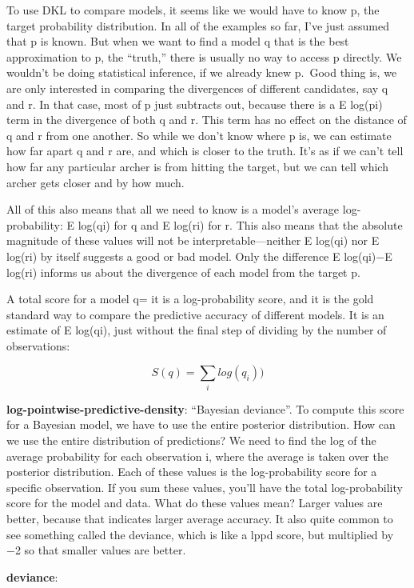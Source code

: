 \documentclass[
]{article}
\begin{document}
To use DKL to compare models, it seems like we would have to know p, the
target probability distribution. In all of the examples so far, I've
just assumed that p is known. But when we want to find a model q that is
the best approximation to p, the ``truth,'' there is usually no way to
access p directly. We wouldn't be doing statistical inference, if we
already knew p.~Good thing is, we are only interested in comparing the
divergences of different candidates, say q and r. In that case, most of
p just subtracts out, because there is a E log(pi) term in the
divergence of both q and r. This term has no effect on the distance of q
and r from one another. So while we don't know where p is, we can
estimate how far apart q and r are, and which is closer to the truth.
It's as if we can't tell how far any particular archer is from hitting
the target, but we can tell which archer gets closer and by how much.

All of this also means that all we need to know is a model's average
log-probability: E log(qi) for q and E log(ri) for r. This also means
that the absolute magnitude of these values will not be
interpretable---neither E log(qi) nor E log(ri) by itself suggests a
good or bad model. Only the difference E log(qi)−E log(ri) informs us
about the divergence of each model from the target p.

A total score for a model q= it is a log-probability score, and it is
the gold standard way to compare the predictive accuracy of different
models. It is an estimate of E log(qi), just without the final step of
dividing by the number of observations:

\[S(q) = \sum_{i} log(q_i))\]

\textbf{log-pointwise-predictive-density}: ``Bayesian deviance''. To
compute this score for a Bayesian model, we have to use the entire
posterior distribution. How can we use the entire distribution of
predictions? We need to find the log of the average probability for each
observation i, where the average is taken over the posterior
distribution. Each of these values is the log-probability score for a
specific observation. If you sum these values, you'll have the total
log-probability score for the model and data. What do these values mean?
Larger values are better, because that indicates larger average
accuracy. It also quite common to see something called the deviance,
which is like a lppd score, but multiplied by −2 so that smaller values
are better.

\textbf{deviance}:
\end{document}
